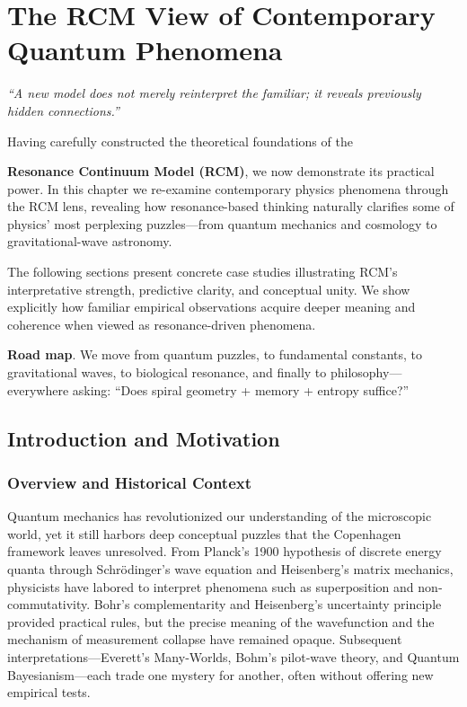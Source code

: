 \chapter{The RCM View of Contemporary Quantum Phenomena}



\begin{center}
\emph{“A new model does not merely reinterpret the familiar; it reveals previously hidden connections.”}
\end{center}

Having carefully constructed the theoretical foundations of the

\textbf{Resonance Continuum Model (RCM)}, we now demonstrate its practical
power.  
In this chapter we re-examine contemporary physics phenomena through the RCM
lens, revealing how resonance-based thinking naturally clarifies some of
physics’ most perplexing puzzles—from quantum mechanics and cosmology to
gravitational-wave astronomy.

The following sections present concrete case studies illustrating RCM’s
interpretative strength, predictive clarity, and conceptual unity.  
We show explicitly how familiar empirical observations acquire deeper meaning
and coherence when viewed as resonance-driven phenomena.

\begin{concept}

\textbf{Road map}.  
We move from quantum puzzles, to fundamental constants, to gravitational waves,
to biological resonance, and finally to philosophy—everywhere asking:
“Does spiral geometry + memory + entropy suffice?”

\end{concept}

\section{Introduction and Motivation}

\subsection{Overview and Historical Context}

Quantum mechanics has revolutionized our understanding of the microscopic world, yet it still harbors deep conceptual puzzles that the Copenhagen framework leaves unresolved.  From Planck’s 1900 hypothesis of discrete energy quanta through Schrödinger’s wave equation and Heisenberg’s matrix mechanics, physicists have labored to interpret phenomena such as superposition and non‐commutativity.  Bohr’s complementarity and Heisenberg’s uncertainty principle provided practical rules, but the precise meaning of the wavefunction and the mechanism of measurement collapse have remained opaque.  Subsequent interpretations—Everett’s Many‐Worlds, Bohm’s pilot‐wave theory, and Quantum Bayesianism—each trade one mystery for another, often without offering new empirical tests.

